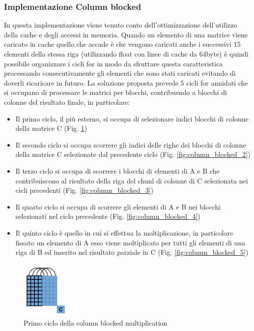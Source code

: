 \documentclass[conference]{IEEEtran}
\begin{document}
\subsubsection{Implementazione Column blocked}
In questa implementazione viene tenuto conto dell'ottimizzazione dell'utilizzo della cache e degli accessi in memoria. Quando un elemento di una matrice viene caricato in cache quello che accade è che vengono caricati anche i successivi 15 elementi della stessa riga (utilizzando float con linee di cache da 64byte) è quindi possibile organizzare i cicli for in modo da sfruttare questa caratteristica processando consecutivamente gli elementi che sono stati caricati evitando di doverli ricaricare in futuro.
La soluzione proposta prevede 5 cicli for annidati che si occupano di processare le matrici per blocchi, contribuendo a blocchi di colonne del risultato finale, in particolare:
\begin{itemize}
    \item Il primo ciclo, il più esterno, si occupa di selezionare indici blocchi di colonne della matrice C (Fig. \ref{fig:column_blocked_1})
    \item Il secondo ciclo si occupa scorrere gli indici delle righe dei blocchi di colonne della matrice C selezionate dal precedente ciclo (Fig. \ref{fig:column_blocked_2})
    \item Il terzo ciclo si occupa di scorrere i blocchi di elementi di A e B che contribuiscono al risultato della riga del chunl di colonne di C selezionata nei cicli precedenti (Fig. \ref{fig:column_blocked_3})
    \item Il quarto ciclo si occupa di scorrere gli elementi di A e B nei blocchi selezionati nel ciclo precedente (Fig. \ref{fig:column_blocked_4})
    \item Il quinto ciclo è quello in cui si effettua la moltiplicazione, in particolare fissato un elemento di A esso viene moltiplicato per tutti gli elementi di una riga di B ed inserito nel risultato parziale in C (Fig. \ref{fig:column_blocked_5})
\end{itemize}
\begin{figure}[H]
    \centering
    \includegraphics[width=0.2\textwidth]{resources/column_blocked_1.png}
    \caption{Primo ciclo della column blocked multiplication}
    \label{fig:column_blocked_1}
\end{figure}
\end{document}
